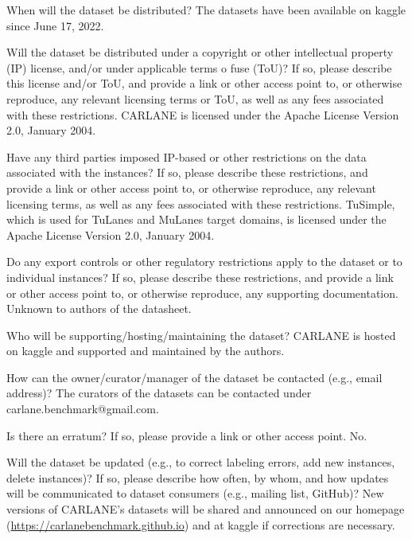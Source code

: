 \documentclass{article}
\begin{document}
	\begin{datasheetitem}{When will the dataset be distributed?}
		The datasets have been available on kaggle since June 17, 2022.
	\end{datasheetitem}
	\begin{datasheetitem}{Will the dataset be distributed under a copyright or other intellectual property (IP) license, and/or under applicable terms o fuse (ToU)? \normalfont If so, please describe this license and/or ToU, and provide a link or other access point to, or otherwise reproduce, any relevant licensing terms or ToU, as well as any fees associated with these restrictions.}
		CARLANE is licensed under the Apache License Version 2.0, January 2004.
	\end{datasheetitem}
	\begin{datasheetitem}{Have any third parties imposed IP-based or other restrictions on the data associated with the instances? \normalfont If so, please describe these restrictions, and provide a link or other access point to, or otherwise reproduce, any relevant licensing terms, as well as any fees associated with these restrictions.}
		TuSimple, which is used for TuLanes and MuLanes target domains, is licensed under the Apache License Version 2.0, January 2004.
	\end{datasheetitem}
	\begin{datasheetitem}{Do any export controls or other regulatory restrictions apply to the dataset or to individual instances? \normalfont If so, please describe these restrictions, and provide a link or other access point to, or otherwise reproduce, any supporting documentation.}
		Unknown to authors of the datasheet.
	\end{datasheetitem}
	\begin{datasheetitem}{Who will be supporting/hosting/maintaining the dataset?}
		CARLANE is hosted on kaggle and supported and maintained by the authors.
	\end{datasheetitem}
	\begin{datasheetitem}{How can the owner/curator/manager of the dataset be contacted (e.g., email address)?}
		The curators of the datasets can be contacted under carlane.benchmark@gmail.com.
	\end{datasheetitem}
	\begin{datasheetitem}{Is there an erratum? \normalfont If so, please provide a link or other access point.}
		No. 
	\end{datasheetitem}
	\begin{datasheetitem}{Will the dataset be updated (e.g., to correct labeling errors, add new instances, delete instances)? \normalfont If so, please describe how often, by whom, and how updates will be communicated to dataset consumers (e.g., mailing list, GitHub)?}
		New versions of CARLANE's datasets will be shared and announced on our homepage (\url{https://carlanebenchmark.github.io}) and at kaggle if corrections are necessary.
	\end{datasheetitem}
\end{document}
